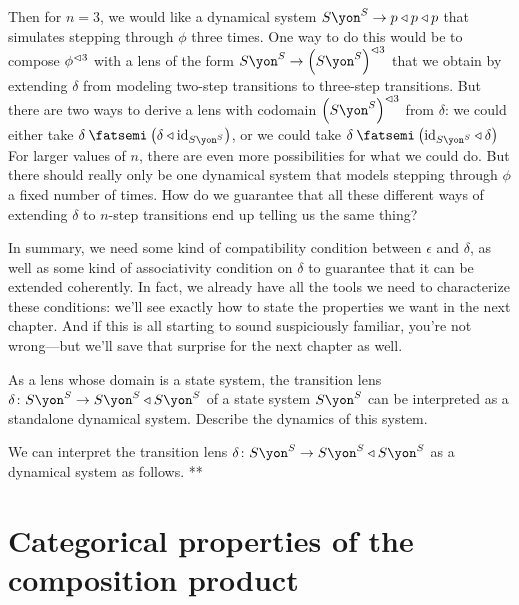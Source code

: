 \documentclass[Book-Poly]{subfiles}
\begin{document}
\begin{example}
Then for $n=3$, we would like a dynamical system $S\yon^S\to p\tri p\tri p$ that simulates stepping through $\phi$ three times.
One way to do this would be to compose $\phi^{\lhd 3}$ with a lens of the form $S\yon^S\to\left(S\yon^S\right)\tripow3$ that we obtain by extending $\delta$ from modeling two-step transitions to three-step transitions.
But there are two ways to derive a lens with codomain $\left(S\yon^S\right)\tripow3$ from $\delta$: we could either take $\delta\then\left(\delta\tri\id_{S\yon^S}\right)$, or we could take $\delta\then\left(\id_{S\yon^S}\tri\delta\right)$
For larger values of $n$, there are even more possibilities for what we could do.
But there should really only be one dynamical system that models stepping through $\phi$ a fixed number of times.
How do we guarantee that all these different ways of extending $\delta$ to $n$-step transitions end up telling us the same thing?

In summary, we need some kind of compatibility condition between $\epsilon$ and $\delta$, as well as some kind of associativity condition on $\delta$ to guarantee that it can be extended coherently.
In fact, we already have all the tools we need to characterize these conditions: we'll see exactly how to state the properties we want in the next chapter.
And if this is all starting to sound suspiciously familiar, you’re not wrong—but we’ll save that surprise for the next chapter as well.
\end{example}


\begin{exercise}
As a lens whose domain is a state system, the transition lens $\delta\colon S\yon^S\to S\yon^S\tri S\yon^S$ of a state system $S\yon^S$ can be interpreted as a standalone dynamical system. Describe the dynamics of this system.
\begin{solution}
We can interpret the transition lens $\delta\colon S\yon^S\to S\yon^S\tri S\yon^S$ as a dynamical system as follows.
**
\end{solution}
\end{exercise}

\section{Categorical properties of the composition product} \label{sec.comon.comp.prop}
\end{document}
